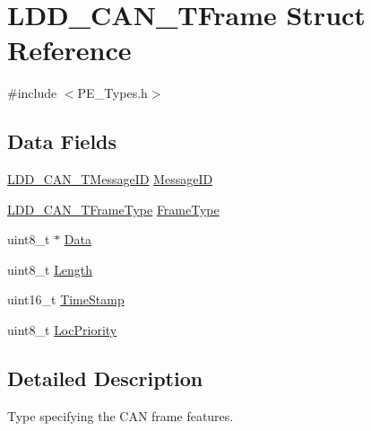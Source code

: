 \hypertarget{struct_l_d_d___c_a_n___t_frame}{\section{L\-D\-D\-\_\-\-C\-A\-N\-\_\-\-T\-Frame Struct Reference}
\label{struct_l_d_d___c_a_n___t_frame}
}


{\ttfamily \#include $<$P\-E\-\_\-\-Types.\-h$>$}

\subsection*{Data Fields}
\begin{DoxyCompactItemize}
\item 
\hyperlink{group___p_e___types__module_gaecf72f09b92ddd90b24939b4e8a901e0}{L\-D\-D\-\_\-\-C\-A\-N\-\_\-\-T\-Message\-I\-D} \hyperlink{struct_l_d_d___c_a_n___t_frame_ab6f347f42b51e9ae318e04cdce84c82c}{Message\-I\-D}
\item 
\hyperlink{group___p_e___types__module_ga4b9fa4349eda01562298f8e63687b0dd}{L\-D\-D\-\_\-\-C\-A\-N\-\_\-\-T\-Frame\-Type} \hyperlink{struct_l_d_d___c_a_n___t_frame_aa46516e37548a263726db8a7319c9b2b}{Frame\-Type}
\item 
uint8\-\_\-t $\ast$ \hyperlink{struct_l_d_d___c_a_n___t_frame_ab83c5354d715da8235b37699a4ad790d}{Data}
\item 
uint8\-\_\-t \hyperlink{struct_l_d_d___c_a_n___t_frame_a04016da0d927a62cdcd7316590c3439e}{Length}
\item 
uint16\-\_\-t \hyperlink{struct_l_d_d___c_a_n___t_frame_a9bab04fefdcfc101f718355bc6e20eb4}{Time\-Stamp}
\item 
uint8\-\_\-t \hyperlink{struct_l_d_d___c_a_n___t_frame_a4018fbfcb01a60be0b1b57413f103693}{Loc\-Priority}
\end{DoxyCompactItemize}


\subsection{Detailed Description}
Type specifying the C\-A\-N frame features. 


